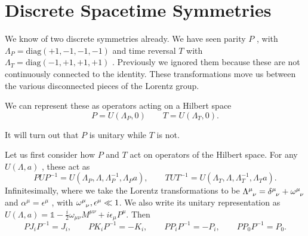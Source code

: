 
\section{Discrete Spacetime Symmetries}%
\label{sec:discrete_spacetime_symmetries}

We know of two discrete symmetries already. We have seen parity $P$ , with $\Lambda_P = \text{diag}(+1, -1, -1, -1)$  and time reversal $T$  with $\Lambda_T = \text{diag}(-1, +1, +1, +1)$ .
Previously we ignored them because these are not continuously connected to the identity.
These transformations move us between the various disconnected pieces of the Lorentz group.

We can represent these as operators acting on a Hilbert space
\begin{equation}
  P = U(\Lambda_P, 0) \qquad T = U(\Lambda_T, 0).
\end{equation}
\begin{leftbar}
  It will turn out that $P$ is unitary while $T$ is not.
\end{leftbar}

Let us first consider how $P$ and $T$ act on operators of the Hilbert space.
For any $U(\Lambda, a)$ , these act as
\begin{equation}
  P U P^{-1} = U (\Lambda_P, \Lambda, \Lambda_P^{-1}, \Lambda_P a), \qquad
  T U T^{-1} = U (\Lambda_T, \Lambda, \Lambda_T^{-1}, \Lambda_T a).
\end{equation}
Infinitesimally, where we take the Lorentz transformations to be $\Lambda\indices{^{\mu}_{\nu}} = \delta\indices{^{\mu}_{\nu}} + \omega\indices{^{\mu}_{\nu}}$  and $\alpha^{\mu} = \epsilon^{\mu}$ , with $\omega\indices{^{\mu}_{\nu}}, \epsilon^{\mu} \ll 1$. We also write its unitary representation as $ U(\Lambda, a) = \mathbb{1} - \frac{i}{2} \omega_{\mu\nu} M^{\mu\nu} + i \epsilon_{\mu} P^{\mu}$.
Then
\begin{equation}
  P J_i P^{-1} = J_i, \qquad
  P K_i P^{-1} = -K_i, \qquad
  P P_i P^{-1} = -P_i, \qquad
  P P_0 P^{-1} = P_0.
\end{equation}


